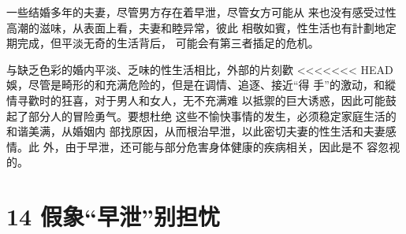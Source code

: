 \documentclass[12pt,UTF8]{ctexbook}
\begin{document}
一些结婚多年的夫妻，尽管男方存在着早泄，尽管女方可能从
来也没有感受过性高潮的滋味，从表面上看，夫妻和睦异常，彼此
相敬如賓，性生活也有計劃地定期完成，但平淡无奇的生活背后，
可能会有第三者插足的危机。

与缺乏色彩的婚内平淡、乏味的性生活相比，外部的片刻歡
<<<<<<< HEAD
娛，尽管是畸形的和充满危险的，但是在调情、追逐、接近“得
手”的激动，和縱情寻歡时的狂喜，对于男人和女人，无不充满难
以抵禦的巨大诱惑，因此可能鼓起了部分人的冒险勇气。要想杜绝
这些不愉快事情的发生，必须稳定家庭生活的和谐美满，从婚姻内
部找原因，从而根治早泄，以此密切夫妻的性生活和夫妻感情。此
外，由于早泄，还可能与部分危害身体健康的疾病相关，因此是不
容忽视的。

\section{14 假象“早泄”别担忧}
\end{document}
